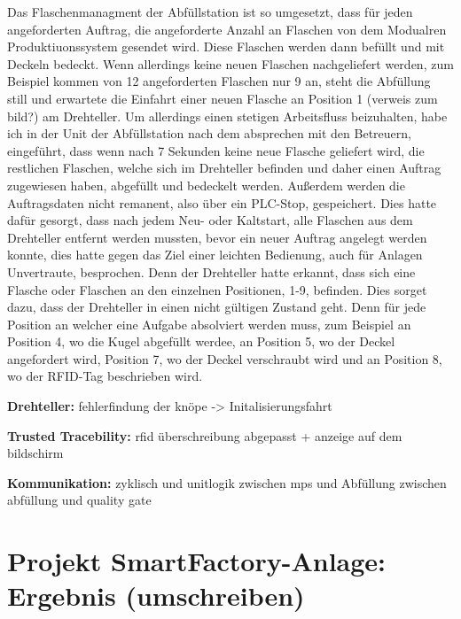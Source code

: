 Das Flaschenmanagment der Abfüllstation ist so umgesetzt, dass für jeden angeforderten Auftrag, die angeforderte Anzahl an Flaschen von dem Modualren 
Produktiuonssystem gesendet wird. Diese Flaschen werden dann befüllt und mit Deckeln bedeckt. Wenn allerdings keine neuen Flaschen nachgeliefert werden, zum 
Beispiel kommen von 12 angeforderten Flaschen nur 9 an, steht die Abfüllung still und erwartete die Einfahrt einer neuen Flasche an Position 1 (verweis zum
bild?) am Drehteller. Um allerdings einen stetigen Arbeitsfluss beizuhalten, habe ich in der Unit der Abfüllstation nach dem absprechen mit den Betreuern, 
eingeführt, dass wenn nach 7 Sekunden keine neue Flasche geliefert wird, die restlichen Flaschen, welche sich im Drehteller befinden und daher einen Auftrag
zugewiesen haben, abgefüllt und bedeckelt werden. 
Außerdem werden die Auftragsdaten nicht remanent, also über ein PLC-Stop, gespeichert. Dies hatte dafür gesorgt, dass nach jedem Neu- oder Kaltstart, alle 
Flaschen aus dem Drehteller entfernt werden mussten, bevor ein neuer Auftrag angelegt werden konnte, dies hatte gegen das Ziel einer leichten Bedienung, auch für
Anlagen Unvertraute, besprochen. Denn der Drehteller hatte erkannt, dass sich eine Flasche oder Flaschen an den einzelnen Positionen, 1-9, befinden. 
Dies sorget dazu, dass der Drehteller in einen nicht gültigen Zustand geht. Denn für jede Position an welcher eine Aufgabe absolviert werden muss, 
zum Beispiel an Position 4, wo die Kugel abgefüllt werdee, an Position 5, wo der Deckel angefordert wird, Position 7, wo der Deckel verschraubt wird und an
Position 8, wo der RFID-Tag beschrieben wird.

\textbf{Drehteller:} 
fehlerfindung der knöpe -> Initalisierungsfahrt 

\textbf{Trusted Tracebility:} 
rfid überschreibung abgepasst + anzeige auf dem bildschirm 

\textbf{Kommunikation:} 
zyklisch und unitlogik zwischen mps und Abfüllung 
zwischen abfüllung und quality gate 

\section{Projekt SmartFactory-Anlage: Ergebnis (umschreiben)}

